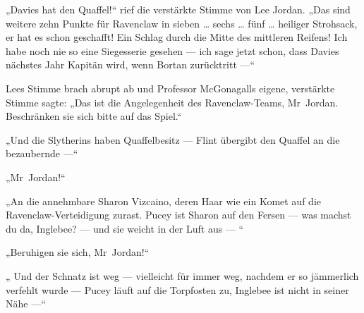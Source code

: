 „Davies hat den Quaffel!“ rief die verstärkte Stimme von Lee Jordan.
„Das sind weitere zehn Punkte für Ravenclaw in sieben … sechs … fünf … heiliger Strohsack, er hat es schon geschafft! Ein Schlag durch die Mitte des mittleren Reifens! Ich habe noch nie so eine Siegesserie gesehen — ich sage jetzt schon, dass Davies nächstes Jahr Kapitän wird, wenn Bortan zurücktritt —“

Lees Stimme brach abrupt ab und Professor McGonagalls eigene, verstärkte Stimme sagte:
„Das ist die Angelegenheit des Ravenclaw-Teams, Mr~Jordan. Beschränken sie sich bitte auf das Spiel.“

„Und die Slytherins haben Quaffelbesitz — Flint übergibt den Quaffel an die bezaubernde —“

„Mr~Jordan!“

„An die annehmbare Sharon Vizcaino, deren Haar wie ein Komet auf die Ravenclaw-Verteidigung zurast. Pucey ist Sharon auf den Fersen — was machst du da, Inglebee? — und sie weicht in der Luft aus — “

„Beruhigen sie sich, Mr~Jordan!“

„ Und der Schnatz ist weg — vielleicht für immer weg, nachdem er so jämmerlich verfehlt wurde — Pucey läuft auf die Torpfosten zu, Inglebee ist nicht in seiner Nähe —“

